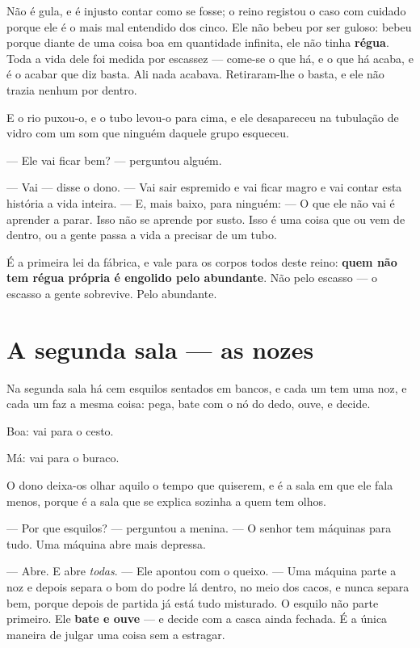 \documentclass[livro.tex]{subfiles}
\begin{document}
Não é gula, e é injusto contar como se fosse; o reino registou o caso com cuidado porque
ele é o mais mal entendido dos cinco. Ele não bebeu por ser guloso: bebeu porque diante de
uma coisa boa em quantidade infinita, ele não tinha \textbf{régua}. Toda a vida dele foi
medida por escassez --- come-se o que há, e o que há acaba, e é o acabar que diz basta.
Ali nada acabava. Retiraram-lhe o basta, e ele não trazia nenhum por dentro.

E o rio puxou-o, e o tubo levou-o para cima, e ele desapareceu na tubulação de vidro com
um som que ninguém daquele grupo esqueceu.

--- Ele vai ficar bem? --- perguntou alguém.

--- Vai --- disse o dono. --- Vai sair espremido e vai ficar magro e vai contar esta
história a vida inteira. --- E, mais baixo, para ninguém: --- O que ele não vai é aprender
a parar. Isso não se aprende por susto. Isso é uma coisa que ou vem de dentro, ou a gente
passa a vida a precisar de um tubo.

\medskip

É a primeira lei da fábrica, e vale para os corpos todos deste reino: \textbf{quem não tem
régua própria é engolido pelo abundante}. Não pelo escasso --- o escasso a gente
sobrevive. Pelo abundante.

\chapter{A segunda sala --- as nozes}

Na segunda sala há cem esquilos sentados em bancos, e cada um tem uma noz, e cada um faz
a mesma coisa: pega, bate com o nó do dedo, ouve, e decide.

Boa: vai para o cesto.

Má: vai para o buraco.

\medskip

O dono deixa-os olhar aquilo o tempo que quiserem, e é a sala em que ele fala menos,
porque é a sala que se explica sozinha a quem tem olhos.

--- Por que esquilos? --- perguntou a menina. --- O senhor tem máquinas para tudo. Uma
máquina abre mais depressa.

--- Abre. E abre \emph{todas}. --- Ele apontou com o queixo. --- Uma máquina parte a noz e
depois separa o bom do podre lá dentro, no meio dos cacos, e nunca separa bem, porque
depois de partida já está tudo misturado. O esquilo não parte primeiro. Ele
\textbf{bate e ouve} --- e decide com a casca ainda fechada. É a única maneira de julgar
uma coisa sem a estragar.
\end{document}
